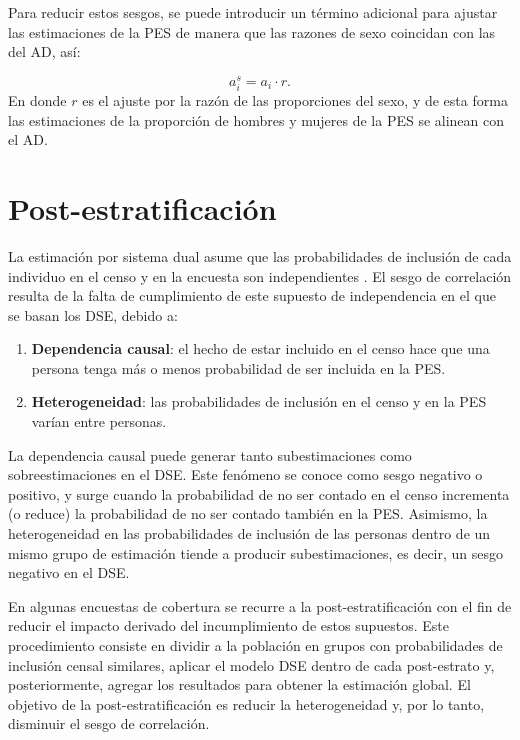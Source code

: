 \documentclass[
  12pt,
]{book}
\begin{document}
Para reducir estos sesgos, se puede introducir un término adicional para ajustar las estimaciones de la PES de manera que las razones de sexo coincidan con las del AD, así:

\[a_{i}^s = a_i \cdot r.\]
En donde \(r\) es el ajuste por la razón de las proporciones del sexo, y de esta forma las estimaciones de la proporción de hombres y mujeres de la PES se alinean con el AD.

\section{Post-estratificación}\label{post-estratificaciuxf3n}

La estimación por sistema dual asume que las probabilidades de inclusión de cada individuo en el censo y en la encuesta son independientes \citep{wolter1986coverage}. El sesgo de correlación resulta de la falta de cumplimiento de este supuesto de independencia en el que se basan los DSE, debido a:

\begin{enumerate}
\def\labelenumi{\arabic{enumi}.}
\item
  \textbf{Dependencia causal}: el hecho de estar incluido en el censo hace que una persona tenga más o menos probabilidad de ser incluida en la PES.
\item
  \textbf{Heterogeneidad}: las probabilidades de inclusión en el censo y en la PES varían entre personas.
\end{enumerate}

La dependencia causal puede generar tanto subestimaciones como sobreestimaciones en el DSE. Este fenómeno se conoce como sesgo negativo o positivo, y surge cuando la probabilidad de no ser contado en el censo incrementa (o reduce) la probabilidad de no ser contado también en la PES. Asimismo, la heterogeneidad en las probabilidades de inclusión de las personas dentro de un mismo grupo de estimación tiende a producir subestimaciones, es decir, un sesgo negativo en el DSE.

En algunas encuestas de cobertura se recurre a la post-estratificación con el fin de reducir el impacto derivado del incumplimiento de estos supuestos. Este procedimiento consiste en dividir a la población en grupos con probabilidades de inclusión censal similares, aplicar el modelo DSE dentro de cada post-estrato y, posteriormente, agregar los resultados para obtener la estimación global. El objetivo de la post-estratificación es reducir la heterogeneidad y, por lo tanto,
disminuir el sesgo de correlación.
\end{document}
